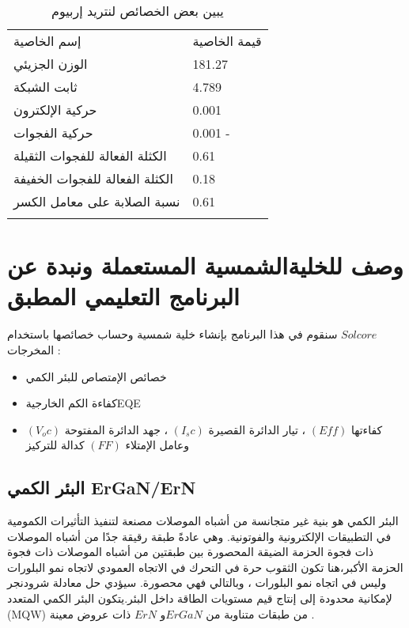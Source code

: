 \begin{table}
	\centering
	\begin{tabular}{ll}
		\hline\noalign{\smallskip}
		إسم الخاصية  & قيمة الخاصية    \\
		\noalign{\smallskip}\hline\noalign{\smallskip}
		الوزن الجزيئي  &  181.27 \\
		ثابت الشبكة  & 4.789 \\
		حركية الإلكترون & 0.001   \\
		حركية الفجوات  & 0.001 -\\
		الكثلة الفعالة للفجوات الثقيلة &  0.61\\
		الكثلة الفعالة للفجوات الخفيفة &  0.18\\
		نسبة الصلابة على معامل الكسر &  0.61\\
		\noalign{\smallskip}\hline
	\end{tabular}
	\caption{  يبين بعض الخصائص لنتريد إربيوم  }
	\label{tab:1}
\end{table}
\FloatBarrier
\section{  وصف للخليةالشمسية المستعملة ونبدة عن البرنامج التعليمي المطبق }
سنقوم في هذا البرنامج بإنشاء خلية شمسية وحساب خصائصها باستخدام     $ Solcore $  \\
المخرجات :
\begin{itemize}
	\item خصائص الإمتصاص للبئر الكمي 
	\item  كفاءة الكم الخارجيةEQE
	\item  كفاءتها $ (Eff) $ ، تيار الدائرة القصيرة $ (I_sc) $ ، جهد الدائرة المفتوحة $ (V_oc)  $وعامل الإمتلاء  $ (FF) $ كدالة للتركيز
\end{itemize}
\subsection{ البئر الكمي ErGaN/ErN } 
البئر الكمي هو بنية غير متجانسة من أشباه الموصلات مصنعة لتنفيذ التأثيرات الكمومية في التطبيقات الإلكترونية والفوتونية. وهي عادةً طبقة رقيقة جدًا من أشباه الموصلات ذات فجوة الحزمة الضيقة المحصورة بين طبقتين من أشباه الموصلات ذات فجوة الحزمة الأكبر،هنا تكون الثقوب حرة في التحرك في الاتجاه العمودي لاتجاه نمو البلورات وليس في اتجاه نمو البلورات ، وبالتالي فهي محصورة. سيؤدي حل معادلة شرودنجر لإمكانية محدودة إلى إنتاج قيم مستويات الطاقة داخل البئر.يتكون البئر الكمي المتعدد  (MQW) من طبقات متناوبة من $ ErGaN $و $  ErN $ ذات عروض معينة .
